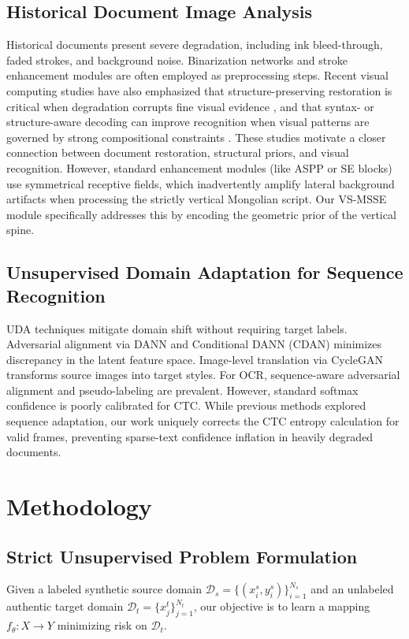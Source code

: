 \documentclass[pdflatex,sn-mathphys-num]{sn-jnl}
\begin{document}
\subsection{Historical Document Image Analysis}
Historical documents present severe degradation, including ink bleed-through, faded strokes, and background noise. Binarization networks \cite{kang2020complex} and stroke enhancement modules \cite{tensmeyer2017document} are often employed as preprocessing steps. Recent visual computing studies have also emphasized that structure-preserving restoration is critical when degradation corrupts fine visual evidence \cite{detailaware2025tvc}, and that syntax- or structure-aware decoding can improve recognition when visual patterns are governed by strong compositional constraints \cite{satd2025tvc}. These studies motivate a closer connection between document restoration, structural priors, and visual recognition. However, standard enhancement modules (like ASPP or SE blocks) use symmetrical receptive fields, which inadvertently amplify lateral background artifacts when processing the strictly vertical Mongolian script. Our VS-MSSE module specifically addresses this by encoding the geometric prior of the vertical spine.

\subsection{Unsupervised Domain Adaptation for Sequence Recognition}
UDA techniques mitigate domain shift without requiring target labels. Adversarial alignment via DANN \cite{ganin2015unsupervised} and Conditional DANN (CDAN) \cite{long2018conditional} minimizes discrepancy in the latent feature space. Image-level translation via CycleGAN \cite{zhu2017unpaired, hoffman2018cycada} transforms source images into target styles. For OCR, sequence-aware adversarial alignment \cite{zhang2019sequence} and pseudo-labeling \cite{zhao2020unsupervised, fang2021read} are prevalent. However, standard softmax confidence is poorly calibrated for CTC. While previous methods \cite{zhang2019sequence, chen2021text} explored sequence adaptation, our work uniquely corrects the CTC entropy calculation for valid frames, preventing sparse-text confidence inflation in heavily degraded documents.

\section{Methodology}

\subsection{Strict Unsupervised Problem Formulation}
Given a labeled synthetic source domain $\mathcal{D}_s = \{(x_i^s, y_i^s)\}_{i=1}^{N_s}$ and an unlabeled authentic target domain $\mathcal{D}_t = \{x_j^t\}_{j=1}^{N_t}$, our objective is to learn a mapping $f_{\theta}: X \rightarrow Y$ minimizing risk on $\mathcal{D}_t$. 
\end{document}
